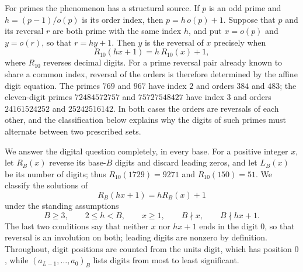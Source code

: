 \documentclass[11pt]{amsart}
\theoremstyle{remark}\newtheorem{remark}[theorem]{Remark}
\begin{document}
For primes the phenomenon has a structural source. If $p$ is an odd prime and $h=(p-1)/o(p)$ is its order index, then $p=h\,o(p)+1$. Suppose that $p$ and its reversal $r$ are both prime with the same index $h$, and put $x=o(p)$ and $y=o(r)$, so that $r=hy+1$. Then $y$ is the reversal of $x$ precisely when
\[
 R_{10}(hx+1)=h\,R_{10}(x)+1,
\]
where $R_{10}$ reverses decimal digits. For a prime reversal pair already known to share a common index, reversal of the orders is therefore determined by the affine digit equation. The primes $769$ and $967$ have index $2$ and orders $384$ and $483$; the eleven-digit primes $72484572757$ and $75727548427$ have index $3$ and orders $24161524252$ and $25242516142$. In both cases the orders are reversals of each other, and the classification below explains why the digits of such primes must alternate between two prescribed sets.

We answer the digital question completely, in every base. For a positive integer $x$, let $R_B(x)$ reverse its base-$B$ digits and discard leading zeros, and let $L_B(x)$ be its number of digits; thus $R_{10}(1729)=9271$ and $R_{10}(150)=51$. We classify the solutions of
\begin{equation}\label{eq:affine}
 R_B(hx+1)=hR_B(x)+1
\end{equation}
under the standing assumptions
\begin{equation}\label{eq:domain}
 B\ge3,\qquad 2\le h<B,\qquad x\ge1,\qquad
 B\nmid x,\qquad B\nmid hx+1.
\end{equation}
The last two conditions say that neither $x$ nor $hx+1$ ends in the digit $0$, so that reversal is an involution on both; leading digits are nonzero by definition. Throughout, digit positions are counted from the units digit, which has position $0$, while $(a_{L-1},\ldots,a_0)_B$ lists digits from most to least significant.
\end{document}
